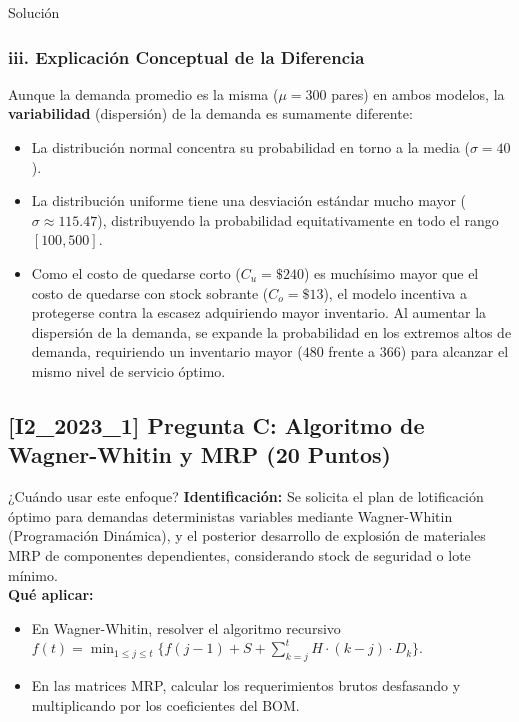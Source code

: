 \documentclass[11pt, a4paper]{article}
\begin{document}
\begin{ejercicio}{Solución}
  \subsubsection*{iii. Explicación Conceptual de la Diferencia}
  Aunque la demanda promedio es la misma ($\mu = 300$ pares) en ambos modelos, la \textbf{variabilidad} (dispersión) de la demanda es sumamente diferente:
  \begin{itemize}
    \item La distribución normal concentra su probabilidad en torno a la media ($\sigma = 40$).
    \item La distribución uniforme tiene una desviación estándar mucho mayor ($\sigma \approx 115.47$), distribuyendo la probabilidad equitativamente en todo el rango $[100, 500]$.
    \item Como el costo de quedarse corto ($C_u = \$240$) es muchísimo mayor que el costo de quedarse con stock sobrante ($C_o = \$13$), el modelo incentiva a protegerse contra la escasez adquiriendo mayor inventario. Al aumentar la dispersión de la demanda, se expande la probabilidad en los extremos altos de demanda, requiriendo un inventario mayor ($480$ frente a $366$) para alcanzar el mismo nivel de servicio óptimo.
  \end{itemize}

\end{ejercicio}

\newpage

\subsection*{[I2_2023_1] Pregunta C: Algoritmo de Wagner-Whitin y MRP (20 Puntos)}
\begin{tipprueba}{¿Cuándo usar este enfoque?}
    \textbf{Identificación:} Se solicita el plan de lotificación óptimo para demandas deterministas variables mediante Wagner-Whitin (Programación Dinámica), y el posterior desarrollo de explosión de materiales MRP de componentes dependientes, considerando stock de seguridad o lote mínimo.\\
    \textbf{Qué aplicar:}
    \begin{itemize}
      \item En Wagner-Whitin, resolver el algoritmo recursivo $f(t) = \min_{1 \le j \le t} \{ f(j-1) + S + \sum_{k=j}^t H \cdot (k-j) \cdot D_k \}$.
      \item En las matrices MRP, calcular los requerimientos brutos desfasando y multiplicando por los coeficientes del BOM.
    \end{itemize}
  \end{tipprueba}
\end{document}
